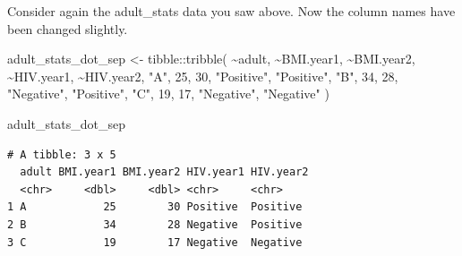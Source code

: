 \documentclass[
  letterpaper,
  DIV=11,
  numbers=noendperiod]{scrreprt}
\newenvironment{Shaded}{\begin{snugshade}}{\end{snugshade}}
\newcommand{\AttributeTok}[1]{\textcolor[rgb]{0.40,0.45,0.13}{#1}}
\newcommand{\DecValTok}[1]{\textcolor[rgb]{0.68,0.00,0.00}{#1}}
\newcommand{\FunctionTok}[1]{\textcolor[rgb]{0.28,0.35,0.67}{#1}}
\newcommand{\NormalTok}[1]{\textcolor[rgb]{0.00,0.23,0.31}{#1}}
\newcommand{\OtherTok}[1]{\textcolor[rgb]{0.00,0.23,0.31}{#1}}
\newcommand{\SpecialCharTok}[1]{\textcolor[rgb]{0.37,0.37,0.37}{#1}}
\newcommand{\StringTok}[1]{\textcolor[rgb]{0.13,0.47,0.30}{#1}}
\begin{document}
\begin{tcolorbox}[enhanced jigsaw, title=\textcolor{quarto-callout-tip-color}{\faLightbulb}\hspace{0.5em}{Practice}, colbacktitle=quarto-callout-tip-color!10!white, leftrule=.75mm, arc=.35mm, opacityback=0, bottomrule=.15mm, rightrule=.15mm, toptitle=1mm, breakable, toprule=.15mm, colback=white, coltitle=black, colframe=quarto-callout-tip-color-frame, bottomtitle=1mm, titlerule=0mm, left=2mm, opacitybacktitle=0.6]

Consider again the adult\_stats data you saw above. Now the column names
have been changed slightly.

\begin{Shaded}
\begin{Highlighting}[]
\NormalTok{adult\_stats\_dot\_sep }\OtherTok{\textless{}{-}} 
\NormalTok{  tibble}\SpecialCharTok{::}\FunctionTok{tribble}\NormalTok{(}
    \SpecialCharTok{\textasciitilde{}}\NormalTok{adult,  }\SpecialCharTok{\textasciitilde{}}\StringTok{\textasciigrave{}}\AttributeTok{BMI.year1}\StringTok{\textasciigrave{}}\NormalTok{,  }\SpecialCharTok{\textasciitilde{}}\StringTok{\textasciigrave{}}\AttributeTok{BMI.year2}\StringTok{\textasciigrave{}}\NormalTok{,  }\SpecialCharTok{\textasciitilde{}}\StringTok{\textasciigrave{}}\AttributeTok{HIV.year1}\StringTok{\textasciigrave{}}\NormalTok{,  }\SpecialCharTok{\textasciitilde{}}\StringTok{\textasciigrave{}}\AttributeTok{HIV.year2}\StringTok{\textasciigrave{}}\NormalTok{,}
       \StringTok{"A"}\NormalTok{,            }\DecValTok{25}\NormalTok{,            }\DecValTok{30}\NormalTok{,    }\StringTok{"Positive"}\NormalTok{,   }\StringTok{"Positive"}\NormalTok{,}
       \StringTok{"B"}\NormalTok{,            }\DecValTok{34}\NormalTok{,            }\DecValTok{28}\NormalTok{,    }\StringTok{"Negative"}\NormalTok{,   }\StringTok{"Positive"}\NormalTok{,}
       \StringTok{"C"}\NormalTok{,            }\DecValTok{19}\NormalTok{,            }\DecValTok{17}\NormalTok{,    }\StringTok{"Negative"}\NormalTok{,   }\StringTok{"Negative"}
\NormalTok{  )}


\NormalTok{adult\_stats\_dot\_sep}
\end{Highlighting}
\end{Shaded}

\begin{verbatim}
# A tibble: 3 x 5
  adult BMI.year1 BMI.year2 HIV.year1 HIV.year2
  <chr>     <dbl>     <dbl> <chr>     <chr>    
1 A            25        30 Positive  Positive 
2 B            34        28 Negative  Positive 
3 C            19        17 Negative  Negative 
\end{verbatim}


\end{tcolorbox}
\end{document}
